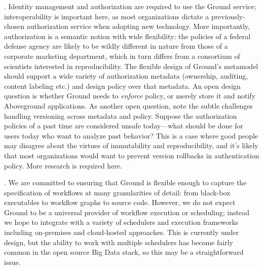 \documentclass{sig-alternate}
\begin{document}
.  Identity management and authorization are required to use the Ground service; interoperability is important here, as most organizations dictate a previously-chosen authorization service when adopting new technology.  More importantly, authorization is a semantic notion with wide flexibility: the policies of a federal defense agency are likely to be wildly different in nature from those of a corporate marketing department, which in turn differs from a consortium of scientists interested in reproducibility.  The flexible design of Ground's metamodel should support a wide variety of authorization metadata (ownership, auditing, content labeling etc.) and design policy over that metadata.  An open design question is whether Ground needs to \emph{enforce} policy, or merely store it and notify Aboveground applications.  As another open question, note the subtle challenges handling versioning across metadata and policy. Suppose the authorization policies of a past time are considered unsafe today---what should be done for users today who want to analyze past behavior? This is a case where good people may disagree about the virtues of immutability and reproducibility, and it's likely that most organizations would want to prevent version rollbacks in authentication policy. More research is required here.


. We are committed to ensuring that Ground is flexible enough to capture the specification of workflows at many granularities of detail: from black-box executables to workflow graphs to source code.  However, we do not expect Ground to be a universal provider of workflow execution or scheduling; instead we hope to integrate with a variety of schedulers and execution frameworks including on-premises and cloud-hosted approaches. This is currently under design, but the ability to work with multiple schedulers has become fairly common in the open source Big Data stack, so this may be a straightforward issue.
\end{document}
